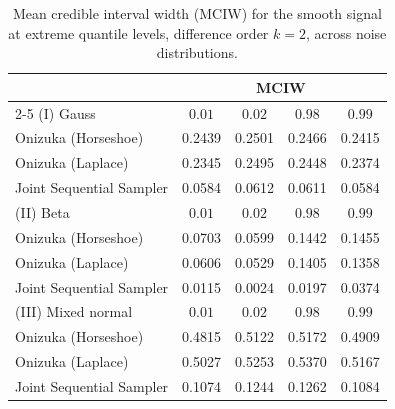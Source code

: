 \begin{table}[htbp]
\centering
\caption{Mean credible interval width (MCIW) for the smooth signal at extreme quantile levels, difference order $k = 2$, across noise distributions.}
\label{tab:s_ext_mciw}
\begin{tabular}{lcccc}
\toprule
& \multicolumn{4}{c}{MCIW} \\
\cmidrule(lr){2-5}
(I) Gauss & $0.01$ & $0.02$ & $0.98$ & $0.99$ \\
\midrule
Onizuka (Horseshoe)      & 0.2439 & 0.2501 & 0.2466 & 0.2415 \\
Onizuka (Laplace)        & 0.2345 & 0.2495 & 0.2448 & 0.2374 \\
Joint Sequential Sampler & 0.0584 & 0.0612 & 0.0611 & 0.0584 \\
\midrule
(II) Beta & $0.01$ & $0.02$ & $0.98$ & $0.99$ \\
\midrule
Onizuka (Horseshoe)      & 0.0703 & 0.0599 & 0.1442 & 0.1455 \\
Onizuka (Laplace)        & 0.0606 & 0.0529 & 0.1405 & 0.1358 \\
Joint Sequential Sampler & 0.0115 & 0.0024 & 0.0197 & 0.0374 \\
\midrule
(III) Mixed normal & $0.01$ & $0.02$ & $0.98$ & $0.99$ \\
\midrule
Onizuka (Horseshoe)      & 0.4815 & 0.5122 & 0.5172 & 0.4909 \\
Onizuka (Laplace)        & 0.5027 & 0.5253 & 0.5370 & 0.5167 \\
Joint Sequential Sampler & 0.1074 & 0.1244 & 0.1262 & 0.1084 \\
\bottomrule
\end{tabular}
\end{table}

\clearpage

